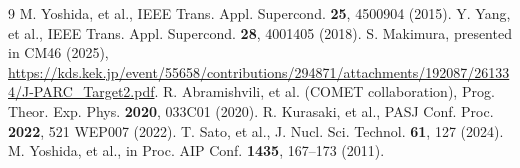 \documentclass[12pt,a4paper]{article}
\begin{document}


\begin{thebibliography}{9}
 M. Yoshida, et al., IEEE Trans. Appl. Supercond. \textbf{25}, 4500904 (2015).
 Y. Yang, et al., IEEE Trans. Appl. Supercond. \textbf{28}, 4001405 (2018).
 S. Makimura, presented in CM46 (2025), \url{https://kds.kek.jp/event/55658/contributions/294871/attachments/192087/261334/J-PARC_Target2.pdf}.
 R. Abramishvili, et al. (COMET collaboration), Prog. Theor. Exp. Phys. \textbf{2020}, 033C01 (2020).
 R. Kurasaki, et al., PASJ Conf. Proc. \textbf{2022}, 521 WEP007 (2022).
 T. Sato, et al., J. Nucl. Sci. Technol. \textbf{61}, 127 (2024).
M. Yoshida, et al., in Proc. AIP Conf. \textbf{1435}, 167--173 (2011).
\end{thebibliography}
\end{document}
